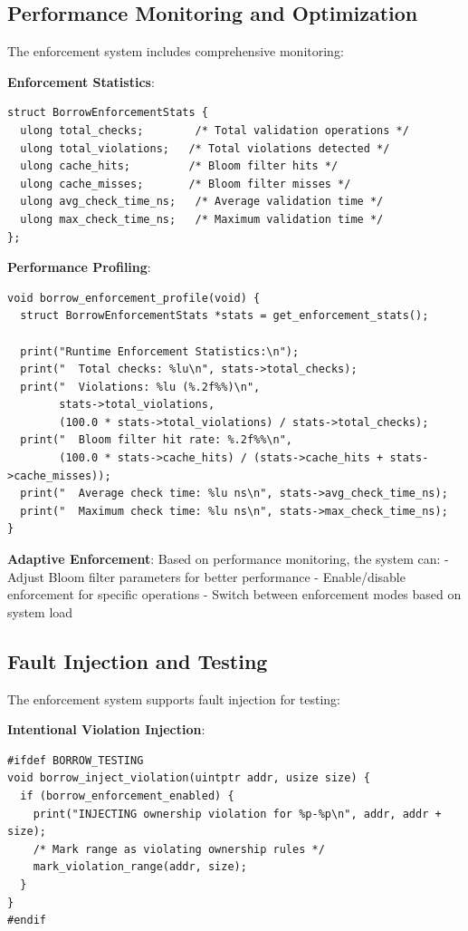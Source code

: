 \documentclass[11pt,letterpaper]{article}
\begin{document}
\subsection{Performance Monitoring and Optimization}

The enforcement system includes comprehensive monitoring:

\textbf{Enforcement Statistics}:

\begin{lstlisting}
struct BorrowEnforcementStats {
  ulong total_checks;        /* Total validation operations */
  ulong total_violations;   /* Total violations detected */
  ulong cache_hits;         /* Bloom filter hits */
  ulong cache_misses;       /* Bloom filter misses */
  ulong avg_check_time_ns;   /* Average validation time */
  ulong max_check_time_ns;   /* Maximum validation time */
};
\end{lstlisting}

\textbf{Performance Profiling}:

\begin{lstlisting}
void borrow_enforcement_profile(void) {
  struct BorrowEnforcementStats *stats = get_enforcement_stats();
  
  print("Runtime Enforcement Statistics:\n");
  print("  Total checks: %lu\n", stats->total_checks);
  print("  Violations: %lu (%.2f%%)\n", 
        stats->total_violations,
        (100.0 * stats->total_violations) / stats->total_checks);
  print("  Bloom filter hit rate: %.2f%%\n",
        (100.0 * stats->cache_hits) / (stats->cache_hits + stats->cache_misses));
  print("  Average check time: %lu ns\n", stats->avg_check_time_ns);
  print("  Maximum check time: %lu ns\n", stats->max_check_time_ns);
}
\end{lstlisting}

\textbf{Adaptive Enforcement}: Based on performance monitoring, the system can:
- Adjust Bloom filter parameters for better performance
- Enable/disable enforcement for specific operations
- Switch between enforcement modes based on system load

\subsection{Fault Injection and Testing}

The enforcement system supports fault injection for testing:

\textbf{Intentional Violation Injection}:

\begin{lstlisting}
#ifdef BORROW_TESTING
void borrow_inject_violation(uintptr addr, usize size) {
  if (borrow_enforcement_enabled) {
    print("INJECTING ownership violation for %p-%p\n", addr, addr + size);
    /* Mark range as violating ownership rules */
    mark_violation_range(addr, size);
  }
}
#endif
\end{lstlisting}
\end{document}

